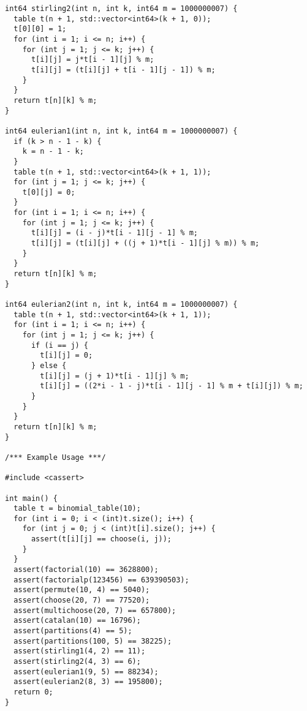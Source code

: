 \begin{lstlisting}
int64 stirling2(int n, int k, int64 m = 1000000007) {
  table t(n + 1, std::vector<int64>(k + 1, 0));
  t[0][0] = 1;
  for (int i = 1; i <= n; i++) {
    for (int j = 1; j <= k; j++) {
      t[i][j] = j*t[i - 1][j] % m;
      t[i][j] = (t[i][j] + t[i - 1][j - 1]) % m;
    }
  }
  return t[n][k] % m;
}

int64 eulerian1(int n, int k, int64 m = 1000000007) {
  if (k > n - 1 - k) {
    k = n - 1 - k;
  }
  table t(n + 1, std::vector<int64>(k + 1, 1));
  for (int j = 1; j <= k; j++) {
    t[0][j] = 0;
  }
  for (int i = 1; i <= n; i++) {
    for (int j = 1; j <= k; j++) {
      t[i][j] = (i - j)*t[i - 1][j - 1] % m;
      t[i][j] = (t[i][j] + ((j + 1)*t[i - 1][j] % m)) % m;
    }
  }
  return t[n][k] % m;
}

int64 eulerian2(int n, int k, int64 m = 1000000007) {
  table t(n + 1, std::vector<int64>(k + 1, 1));
  for (int i = 1; i <= n; i++) {
    for (int j = 1; j <= k; j++) {
      if (i == j) {
        t[i][j] = 0;
      } else {
        t[i][j] = (j + 1)*t[i - 1][j] % m;
        t[i][j] = ((2*i - 1 - j)*t[i - 1][j - 1] % m + t[i][j]) % m;
      }
    }
  }
  return t[n][k] % m;
}

/*** Example Usage ***/

#include <cassert>

int main() {
  table t = binomial_table(10);
  for (int i = 0; i < (int)t.size(); i++) {
    for (int j = 0; j < (int)t[i].size(); j++) {
      assert(t[i][j] == choose(i, j));
    }
  }
  assert(factorial(10) == 3628800);
  assert(factorialp(123456) == 639390503);
  assert(permute(10, 4) == 5040);
  assert(choose(20, 7) == 77520);
  assert(multichoose(20, 7) == 657800);
  assert(catalan(10) == 16796);
  assert(partitions(4) == 5);
  assert(partitions(100, 5) == 38225);
  assert(stirling1(4, 2) == 11);
  assert(stirling2(4, 3) == 6);
  assert(eulerian1(9, 5) == 88234);
  assert(eulerian2(8, 3) == 195800);
  return 0;
}
\end{lstlisting}
